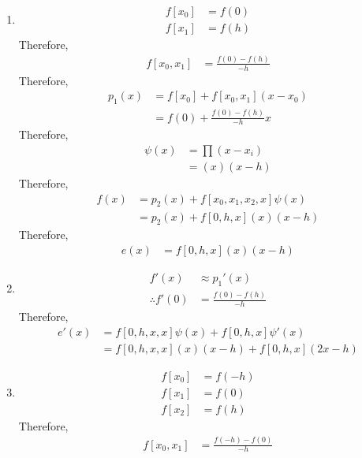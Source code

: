 \documentclass[fleqn, a4paper, 11pt, oneside, reqno]{amsart}
\theoremstyle{definition}
\theoremstyle{theorem}
\begin{document}
\begin{solution}
	\begin{enumerate}[leftmargin=*]
		\item
			\begin{align*}
				f[x_0] & = f(0) \\
				f[x_1] & = f(h)
			\end{align*}
			Therefore,
			\begin{align*}
				f[x_0,x_1] & = \frac{f(0) - f(h)}{-h}
			\end{align*}
			Therefore,
			\begin{align*}
				p_1(x) & = f[x_0] + f[x_0,x_1] (x - x_0) \\
                                       & = f(0) + \frac{f(0) - f(h)}{-h} x
			\end{align*}
			Therefore,
			\begin{align*}
				\psi(x) & = \prod (x - x_i) \\
                                        & = (x) (x - h)
			\end{align*}
			Therefore,
			\begin{align*}
				f(x) & = p_2(x) + f[x_0,x_1,x_2,x] \psi(x) \\
                                     & = p_2(x) + f[0,h,x] (x) (x - h)
			\end{align*}
			Therefore,
			\begin{align*}
				e(x) & = f[0,h,x] (x) (x - h)
			\end{align*}
		\item
			\begin{align*}
				f'(x)            & \approx {p_1}'(x) \\
				\therefore f'(0) & = \frac{f(0) - f(h)}{-h}
			\end{align*}
			Therefore,
			\begin{align*}
				e'(x) & = f[0,h,x,x] \psi(x) + f[0,h,x] \psi'(x) \\
                                      & = f[0,h,x,x] (x) (x - h) + f[0,h,x] (2 x - h)
			\end{align*}
		\item
			\begin{align*}
				f[x_0] & = f(-h) \\
				f[x_1] & = f(0)  \\
				f[x_2] & = f(h)
			\end{align*}
			Therefore,
			\begin{align*}
				f[x_0,x_1] & = \frac{f(-h) - f(0)}{-h} \\

\end{align*}
\end{enumerate}
\end{solution}
\end{document}

